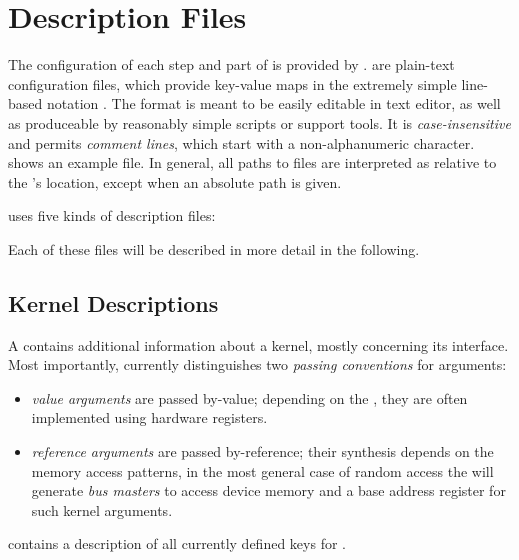 \section{Description Files}\label{sec:description-files}%
The configuration of each step and part of \tpc{} is provided by .
 are plain-text configuration files, which provide key-value maps in the extremely simple line-based notation .
The format is meant to be easily editable in text editor, as well as produceable by reasonably simple scripts or support tools.
It is \emph{case-insensitive} and permits \emph{comment lines}, which start with a non-alphanumeric character.  shows an example file.
In general, all paths to files are interpreted as relative to the 's location, except when an absolute path is given.
%

%
\tpc{} uses five kinds of description files:

\begin{compactenum}
  \item {}
  \item {}
  \item {}
  \item {}
  \item {}
\end{compactenum}
Each of these files will be described in more detail in the following.

\subsection{Kernel Descriptions}
A  contains additional information about a kernel, mostly concerning its interface.
Most importantly, \tpc{} currently distinguishes two \emph{passing conventions} for arguments:
%
\begin{itemize}
  \item \emph{value arguments} are passed by-value; depending on the , they are often implemented using hardware registers.
  \item \emph{reference arguments} are passed by-reference; their synthesis depends on the memory access patterns, in the most general case of random access the  will generate \emph{bus masters} to access device memory and a base address register for such kernel arguments.
\end{itemize}
 contains a description of all currently defined keys for .

